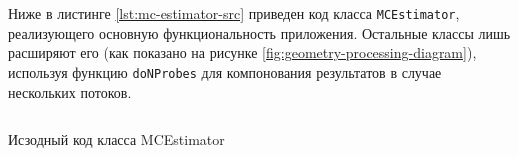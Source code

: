 Ниже в листинге \ref{lst:mc-estimator-src} приведен код класса \texttt{MCEstimator}, реализующего основную функциональность приложения. 
Остальные классы лишь расширяют его (как показано на рисунке \ref{fig:geometry-processing-diagram}), используя функцию 
\texttt{doNProbes} для компонования результатов в случае нескольких потоков.

\begin{listing}[H]
    \inputminted{java}{resources/src/01_MCEstimator}
    \caption{Исзодный код класса MCEstimator}
    \label{lst:mc-estimator-src}
\end{listing}